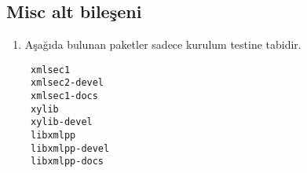 \documentclass[a4paper,10pt]{article}
\begin{document}
\subsection{Misc alt bileşeni}
\begin{enumerate}
 \item Aşağıda bulunan paketler sadece kurulum testine tabidir.

\begin{verbatim}
 xmlsec1
 xmlsec2-devel
 xmlsec1-docs
 xylib
 xylib-devel
 libxmlpp
 libxmlpp-devel
 libxmlpp-docs
\end{verbatim}

\end{enumerate}
\end{document}
